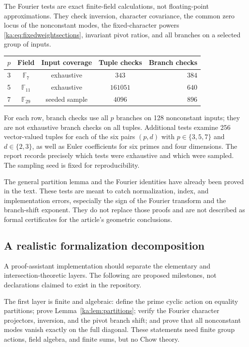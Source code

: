 \documentclass[11pt,a4paper]{article}
\theoremstyle{definition}
\theoremstyle{remark}
\newcommand{\F}{\mathbb F}
\begin{document}
The Fourier tests are exact finite-field calculations, not floating-point
approximations. They check inversion, character covariance, the common
zero locus of the nonconstant modes, the fixed-character powers
\eqref{ka:eq:fixedweightsections}, invariant pivot ratios, and all branches
on a selected group of inputs.
\begin{center}
\begin{tabular}{@{}ccccr@{}}
\toprule
$p$ & Field & Input coverage & Tuple checks & Branch checks\\
\midrule
3 & $\F_7$ & exhaustive & $343$ & $384$\\
5 & $\F_{11}$ & exhaustive & $161051$ & $640$\\
7 & $\F_{29}$ & seeded sample & $4096$ & $896$\\
\bottomrule
\end{tabular}
\end{center}
For each row, branch checks use all $p$ branches on 128 nonconstant
inputs; they are not exhaustive branch checks on all tuples.
Additional tests examine 256 vector-valued tuples for each of the six
pairs $(p,d)$ with $p\in\{3,5,7\}$ and $d\in\{2,3\}$, as well as
Euler coefficients for six primes and four dimensions. The report
records precisely which tests were exhaustive and which were sampled.
The sampling seed is fixed for reproducibility.

The general partition lemma and the Fourier identities have already
been proved in the text. These tests are meant to catch normalization,
index, and implementation errors, especially the sign of the Fourier
transform and the branch-shift exponent. They do not replace those
proofs and are not described as formal certificates for the article's
geometric conclusions.

\subsection{A realistic formalization decomposition}
A proof-assistant implementation should separate the elementary and
intersection-theoretic layers. The following are proposed milestones,
not declarations claimed to exist in the repository.

The first layer is finite and algebraic: define the prime cyclic action
on equality partitions; prove Lemma~\ref{ka:lem:partitions}; verify the
Fourier character projectors, inversion, and the pivot branch shift;
and prove that all nonconstant modes vanish exactly on the full
diagonal. These statements need finite group actions, field algebra,
and finite sums, but no Chow theory.
\end{document}
